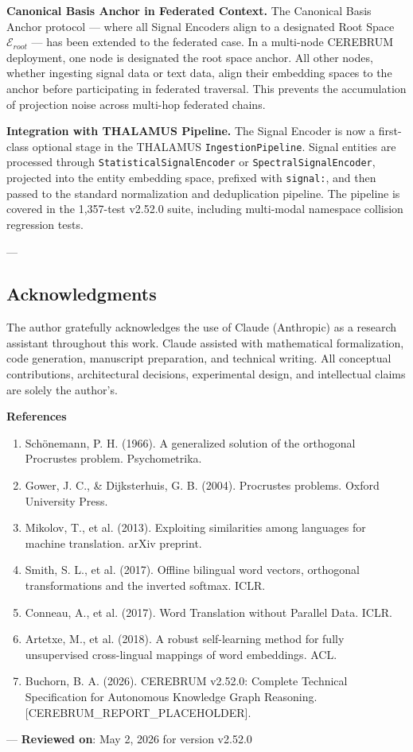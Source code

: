 \textbf{Canonical Basis Anchor in Federated Context.} The Canonical Basis Anchor protocol — where all Signal Encoders align to a designated Root Space $\mathcal{E}_{root}$ — has been extended to the federated case. In a multi-node CEREBRUM deployment, one node is designated the root space anchor. All other nodes, whether ingesting signal data or text data, align their embedding spaces to the anchor before parti\-cipating in federated traversal. This prevents the accum\-ulation of projection noise across multi-hop federated chains.

\textbf{Integration with THALAMUS Pipeline.} The Signal Encoder is now a first-class optional stage in the THALAMUS \texttt{IngestionPipeline}. Signal entities are processed through \texttt{StatisticalSignalEncoder} or \texttt{SpectralSignalEncoder}, projected into the entity embedding space, prefixed with \texttt{signal:}, and then passed to the standard norma\-lization and dedup\-lication pipeline. The pipeline is covered in the 1,357-test v2.52.0 suite, including multi-modal namespace collision regression tests.

---
\subsection{Acknow\-ledgments}

The author gratefully ackno\-wledges the use of Claude (Anthropic) as a research assistant throughout this work. Claude assisted with mathe\-matical forma\-lization, code generation, manuscript preparation, and technical writing. All conceptual contr\-ibutions, archi\-tectural decisions, exper\-imental design, and intel\-lectual claims are solely the author's.

\textbf{References}
\begin{enumerate}
\item Schönemann, P. H. (1966). A generalized solution of the orthogonal Procrustes problem. Psycho\-metrika.
\item Gower, J. C., \& Dijkst\-erhuis, G. B. (2004). Procrustes problems. Oxford University Press.
\item Mikolov, T., et al. (2013). Exploiting simil\-arities among languages for machine translation. arXiv preprint.
\item Smith, S. L., et al. (2017). Offline bilingual word vectors, orthogonal trans\-formations and the inverted softmax. ICLR.
\item Conneau, A., et al. (2017). Word Translation without Parallel Data. ICLR.
\item Artetxe, M., et al. (2018). A robust self-learning method for fully unsup\-ervised cross-lingual mappings of word embeddings. ACL.
\item Buchorn, B. A. (2026). CEREBRUM v2.52.0: Complete Technical Specif\-ication for Autonomous Knowledge Graph Reasoning. [CEREBRUM\_REPORT\_PLACEHOLDER].

\end{enumerate}
---
\textbf{Reviewed on}: May 2, 2026 for version v2.52.0
